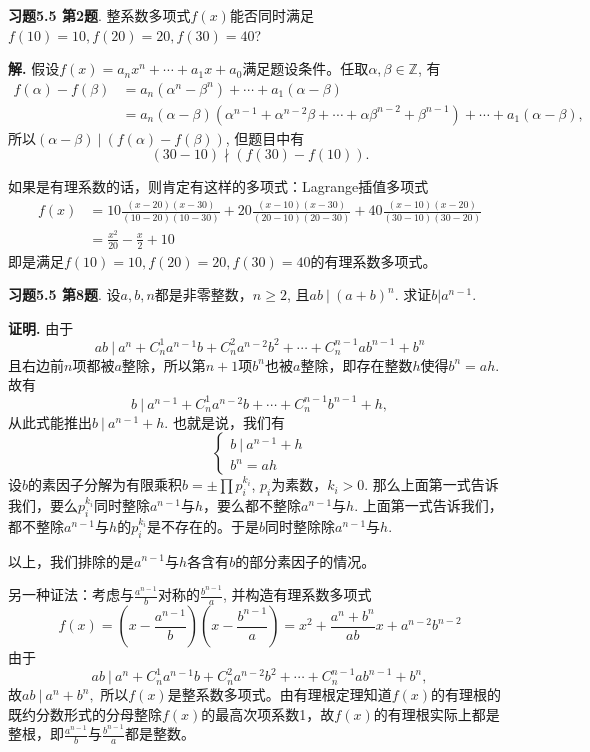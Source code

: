 {\bf 习题5.5 第2题}. 整系数多项式$f(x)$能否同时满足$f(10)=10, f(20)=20, f(30)=40$?

{\bf 解.} 假设$f(x) = a_nx^n + \cdots + a_1x + a_0$满足题设条件。任取$\alpha,\beta\in\mathbb{Z}$, 有
\begin{align*}
f(\alpha) - f(\beta) & = a_n(\alpha^n-\beta^n) + \cdots + a_1(\alpha-\beta) \\
& = a_n(\alpha-\beta)(\alpha^{n-1}+\alpha^{n-2}\beta+\cdots+\alpha\beta^{n-2}+\beta^{n-1}) + \cdots + a_1(\alpha-\beta),
\end{align*}
所以$(\alpha-\beta) \ |\ (f(\alpha) - f(\beta))$, 但题目中有
$$(30-10) \nmid (f(30)-f(10)).$$

如果是有理系数的话，则肯定有这样的多项式：Lagrange插值多项式
\begin{align*}
f(x) & = 10\frac{(x-20)(x-30)}{(10-20)(10-30)} + 20\frac{(x-10)(x-30)}{(20-10)(20-30)} + 40\frac{(x-10)(x-20)}{(30-10)(30-20)} \\
& = \frac{x^2}{20} - \frac{x}{2} + 10
\end{align*}
即是满足$f(10)=10, f(20)=20, f(30)=40$的有理系数多项式。


\newpageorvspace


{\bf 习题5.5 第8题}. 设$a,b,n$都是非零整数，$n\geqslant 2$, 且$ab\ |\ (a+b)^n$. 求证$b|a^{n-1}$.

{\bf 证明.} 由于
$$ab\ |\ a^n + C_n^1a^{n-1}b + C_n^2a^{n-2}b^2 + \cdots + C_n^{n-1}ab^{n-1} + b^n$$
且右边前$n$项都被$a$整除，所以第$n+1$项$b^n$也被$a$整除，即存在整数$h$使得$b^n = ah$. 故有
$$b\ |\ a^{n-1} + C_n^1a^{n-2}b + \cdots + C_n^{n-1}b^{n-1} + h,$$
从此式能推出$b\ |\ a^{n-1} + h$. 也就是说，我们有
$$
\begin{cases}
b\ |\ a^{n-1} + h \\
b^n = ah
\end{cases}
$$
设$b$的素因子分解为有限乘积$b = \pm \prod p_i^{k_i}$, $p_i$为素数，$k_i>0$. 那么上面第一式告诉我们，要么$p_i^{k_i}$同时整除$a^{n-1}$与$h$，要么都不整除$a^{n-1}$与$h$. 上面第一式告诉我们，都不整除$a^{n-1}$与$h$的$p_i^{k_i}$是不存在的。于是$b$同时整除除$a^{n-1}$与$h$.

以上，我们排除的是$a^{n-1}$与$h$各含有$b$的部分素因子的情况。

另一种证法：考虑与$\frac{a^{n-1}}{b}$对称的$\frac{b^{n-1}}{a}$, 并构造有理系数多项式
$$f(x) = \left(x-\frac{a^{n-1}}{b}\right) \left(x-\frac{b^{n-1}}{a}\right) = x^2 + \frac{a^n+b^n}{ab} x + a^{n-2}b^{n-2}$$
由于
$$ab\ |\ a^n + C_n^1a^{n-1}b + C_n^2a^{n-2}b^2 + \cdots + C_n^{n-1}ab^{n-1} + b^n,$$
故$ab\ |\ a^n + b^n,$ 所以$f(x)$是整系数多项式。由有理根定理知道$f(x)$的有理根的既约分数形式的分母整除$f(x)$的最高次项系数1，故$f(x)$的有理根实际上都是整根，即$\frac{a^{n-1}}{b}$与$\frac{b^{n-1}}{a}$都是整数。



